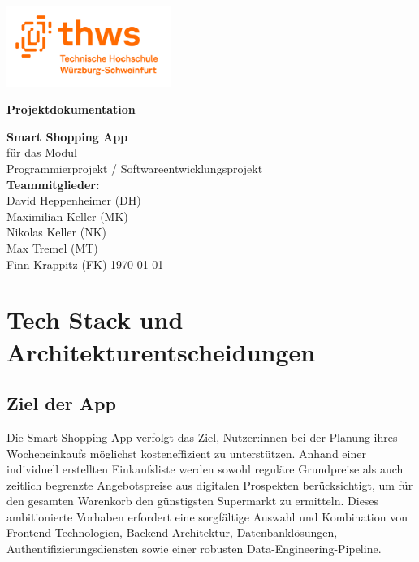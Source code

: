 \documentclass[12pt, a4paper]{report} %
\newcommand{\authorinitials}{} %
\begin{document}
\begin{titlepage}
    \begin{center}
        \includegraphics[width=0.4\textwidth]{media/THWS_logo.png}
    \end{center}
    \centering
    \vspace*{2cm}
    {\LARGE\bfseries Projektdokumentation \par}
    \vspace{1.5cm}
    {\Large \textbf{Smart Shopping App} \\[3mm]}
    \vspace{1cm}
    {\large für das Modul\\
      Programmierprojekt / Softwareentwicklungsprojekt\\}
    \vspace{1.5cm}
    {\large
      \textbf{Teammitglieder:}\\[5mm]
      David Heppenheimer (DH)\\
      Maximilian Keller (MK)\\
      Nikolas Keller (NK)\\
      Max Tremel (MT)\\
      Finn Krappitz (FK)
    }
    \vfill
    {\large \today}
\end{titlepage}

\tableofcontents
\cleardoublepage
\chapter{Tech Stack und Architekturentscheidungen}
\renewcommand{\authorinitials}{DH}


\label{chap:tech_stack}

\section{Ziel der App}
Die Smart Shopping App verfolgt das Ziel, Nutzer:innen bei der Planung ihres Wocheneinkaufs möglichst kosteneffizient zu unterstützen. Anhand einer individuell erstellten Einkaufsliste werden sowohl reguläre Grundpreise als auch zeitlich begrenzte Angebots­preise aus digitalen Prospekten berücksichtigt, um für den gesamten Warenkorb den günstigsten Supermarkt zu ermitteln. Dieses ambitionierte Vorhaben erfordert eine sorgfältige Auswahl und Kombination von Frontend-Technologien, Backend-Architektur, Datenbanklösungen, Authentifizierungsdiensten sowie einer robusten Data-Engineering-Pipeline.
\end{document}
